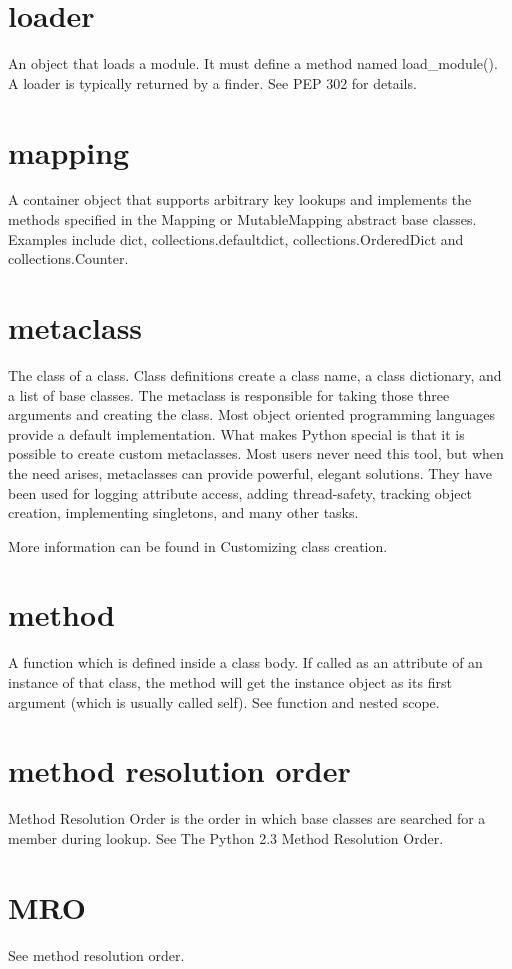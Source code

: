 \documentclass[12pt,a4paper,final,twoside,onecolumn,titlepage]{book}
\begin{document}
\section{loader}
An object that loads a module. It must define a method named load\_module(). A loader is typically returned by a finder. See PEP 302 for details.

\section{mapping}
A container object that supports arbitrary key lookups and implements the methods specified in the Mapping or MutableMapping abstract base classes. Examples include dict, collections.defaultdict, collections.OrderedDict and collections.Counter.

\section{metaclass}
The class of a class. Class definitions create a class name, a class dictionary, and a list of base classes. The metaclass is responsible for taking those three arguments and creating the class. Most object oriented programming languages provide a default implementation. What makes Python special is that it is possible to create custom metaclasses. Most users never need this tool, but when the need arises, metaclasses can provide powerful, elegant solutions. They have been used for logging attribute access, adding thread-safety, tracking object creation, implementing singletons, and many other tasks.

More information can be found in Customizing class creation.

\section{method}
A function which is defined inside a class body. If called as an attribute of an instance of that class, the method will get the instance object as its first argument (which is usually called self). See function and nested scope.

\section{method resolution order}
Method Resolution Order is the order in which base classes are searched for a member during lookup. See The Python 2.3 Method Resolution Order.

\section{MRO}
See method resolution order.
\end{document}
